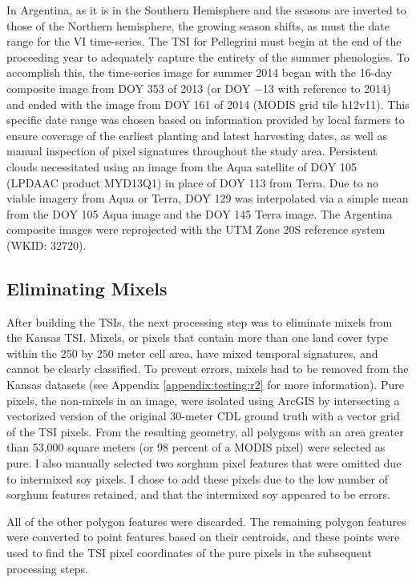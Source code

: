 In Argentina, as it is in the Southern Hemisphere and the seasons are inverted to those of the Northern hemisphere, the growing season shifts, as must the date range for the VI time-series. The TSI for Pellegrini must begin at the end of the proceeding year to adequately capture the entirety of the summer phenologies. To accomplish this, the time-series image for summer 2014 began with the 16-day composite image from DOY 353 of 2013 (or DOY −13 with reference to 2014) and ended with the image from DOY 161 of 2014 (MODIS grid tile h12v11). This specific date range was chosen based on information provided by local farmers to ensure coverage of the earliest planting and latest harvesting dates, as well as manual inspection of pixel signatures throughout the study area. Persistent clouds necessitated using an image from the Aqua satellite of DOY 105 (LPDAAC product MYD13Q1) in place of DOY 113 from Terra. Due to no viable imagery from Aqua or Terra, DOY 129 was interpolated via a simple mean from the DOY 105 Aqua image and the DOY 145 Terra image. The Argentina composite images were reprojected with the UTM Zone 20S reference system (WKID: 32720).

\subsection{Eliminating Mixels}

After building the TSIs, the next processing step was to eliminate mixels from the Kansas TSI. Mixels, or pixels that contain more than one land cover type within the 250 by 250 meter cell area, have mixed temporal signatures, and cannot be clearly classified. To prevent errors, mixels had to be removed from the Kansas datasets (see Appendix \ref{appendix:testing:r2} for more information). Pure pixels, the non-mixels in an image, were isolated using ArcGIS \autocite{arcgis10.1} by intersecting a vectorized version of the original 30-meter CDL ground truth with a vector grid of the TSI pixels. From the resulting geometry, all polygons with an area greater than 53,000 square meters (or 98 percent of a MODIS pixel) were selected as pure. I also manually selected two sorghum pixel features that were omitted due to intermixed soy pixels. I chose to add these pixels due to the low number of sorghum features retained, and that the intermixed soy appeared to be errors.

All of the other polygon features were discarded. The remaining polygon features were converted to point features based on their centroids, and these points were used to find the TSI pixel coordinates of the pure pixels in the subsequent processing steps. 

